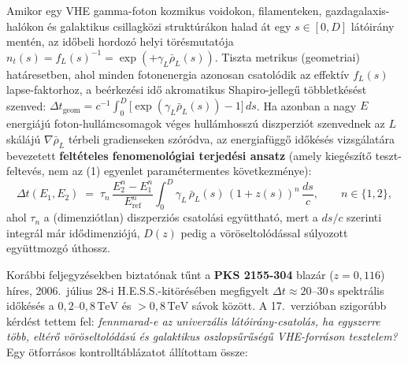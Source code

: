 \documentclass[10pt,a4paper]{article}
\begin{document}
\par
Amikor egy VHE gamma-foton kozmikus voidokon, filamenteken, gazdagalaxis-hal\'okon \'es galaktikus csillagk\"ozi strukt\'ur\'akon halad \'at egy $s \in [0, D]$ l\'at\'oir\'any ment\'en, az id\H{o}beli hordoz\'o helyi t\"or\'esmutat\'oja $n_t(s) = f_L(s)^{-1} = \exp(+\gamma_L \bar{\rho}_L(s))$. Tiszta metrikus (geometriai) hat\'aresetben, ahol minden fotonenergia azonosan csatol\'odik az effekt\'iv $f_L(s)$ lapse-faktorhoz, a be\'erkez\'esi id\H{o} akromatikus Shapiro-jelleg\H{u} t\"obbletk\'es\'est szenved: $\Delta t_{\text{geom}} = c^{-1}\int_0^D \bigl[\exp(\gamma_L\bar{\rho}_L(s)) - 1\bigr]\,ds$. Ha azonban a nagy $E$ energi\'aj\'u foton-hull\'amcsomagok v\'eges hull\'amhossz\'u diszperzi\'ot szenvednek az $L$ sk\'al\'aj\'u $\nabla\bar{\rho}_L$ t\'erbeli gradienseken sz\'or\'odva, az energiaf\"ugg\H{o} id\H{o}k\'es\'es vizsg\'alat\'ara bevezetett \textbf{felt\'eteles fenomenol\'ogiai terjed\'esi ansatz} (amely kieg\'esz\'it\H{o} teszt-feltev\'es, nem az (1) egyenlet param\'etermentes k\"ovetkezm\'enye):
\begin{equation}
  \Delta t(E_1, E_2) \;=\; \tau_n\,\frac{E_2^n - E_1^n}{E_{\text{ref}}^n}\int_0^D \gamma_L\,\bar{\rho}_L(s)\,(1+z(s))^n\,\frac{ds}{c}, \qquad n \in \{1, 2\},
\end{equation}
ahol $\tau_n$ a (dimenzi\'otlan) diszperzi\'os csatol\'asi egy\"utthat\'o, mert a $ds/c$ szerinti integr\'al m\'ar id\H{o}dimenzi\'oj\'u, $D(z)$ pedig a v\"or\"oseltol\'od\'assal s\'ulyozott egy\"uttmozg\'o \'uthossz.

\par
Kor\'abbi feljegyz\'esekben biztat\'onak t\H{u}nt a \textbf{PKS 2155-304} blaz\'ar ($z = 0{,}116$) h\'ires, 2006.\ j\'ulius 28-i H.E.S.S.-kit\"or\'es\'eben megfigyelt $\Delta t \approx 20\text{--}30\,\text{s}$ spektr\'alis id\H{o}k\'es\'es a $0{,}2\text{--}0{,}8\,\text{TeV}$ \'es $>0{,}8\,\text{TeV}$ s\'avok k\"oz\"ott. A 17.\ verzi\'oban szigor\'ubb k\'erd\'est tettem fel: \emph{fennmarad-e az univerz\'alis l\'at\'oir\'any-csatol\'as, ha egyszerre t\"obb, elt\'er\H{o} v\"or\"oseltol\'od\'as\'u \'es galaktikus oszlops\H{u}r\H{u}s\'eg\H{u} VHE-forr\'ason tesztelem?} Egy \"otforr\'asos kontrollt\'abl\'azatot \'all\'itottam \"ossze:
\end{document}
